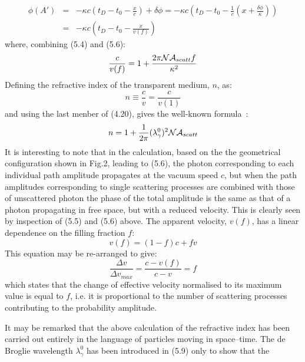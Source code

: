 \documentclass [12pt]{article}
\begin{document}
{   \begin{eqnarray}
 \phi(A') & = & - \kappa c\left(t_D-t_0- \frac{x}{c} \right) + \delta \phi
   =  - \kappa c\left(t_D-t_0 - \frac{1}{c}(x+\frac{ \delta \phi}{\kappa}) \right) 
  \nonumber \\
   & = & - \kappa c\left(t_D-t_0-\frac{x}{v(f)} \right)
 \end{eqnarray}
   where, combining (5.4) and (5.6):
   \begin{equation}
  \frac{c }{v(f)} = 1+  \frac{2 \pi {\cal N} {\cal A}_{scatt} f }{ \kappa^2}
 \end{equation}
   Defining the refractive index of the transparent
    medium, $n$, as:
     \begin{equation}
    n \equiv \frac{c}{v} = \frac{c}{v(1)}   
 \end{equation}
   and using the last menber of (4.20), gives the well-known formula~\cite{Sakurai}:
      \begin{equation}
    n  = 1 + \frac{1}{2 \pi} (\lambda_{\gamma}^0)^2 {\cal N} {\cal A}_{scatt}   
 \end{equation} 
   It is interesting to note that in the calculation, based on the the geometrical
  configuration shown in Fig.2, leading to (5.6), the photon corresponding to each 
  individual path amplitude propagates at the vacuum speed $c$, but when the path amplitudes 
   corresponding to single scattering processes  are combined with those of unscattered 
  photon the phase of the total amplitude is the same as that of a photon
  propagating in free space, but with a reduced velocity. This is clearly seen by inspection
  of (5.5) and (5.6) above.
 The apparent velocity, $v(f)$, has a linear dependence
 on the filling fraction $f$:
     \begin{equation}
 v(f) = (1-f)c+fv
 \end{equation}
This equation may be re-arranged to give:
     \begin{equation}
  \frac{\Delta v}{\Delta v_{max}} = \frac{c- v(f)}{c- v} = f
\end{equation}
 which states that the change of effective velocity normalised 
to its maximum value is  equal to $f$, i.e. it is proportional to the number of
 scattering processes contributing to the probability amplitude.
 \par It may be remarked that the above calculation of the refractive index has been
 carried out entirely in the language of particles moving in space--time. The de Broglie
 wavelength  $\lambda_{\gamma}^0$ has been introduced in (5.9) only to show that the
}
\end{document}
